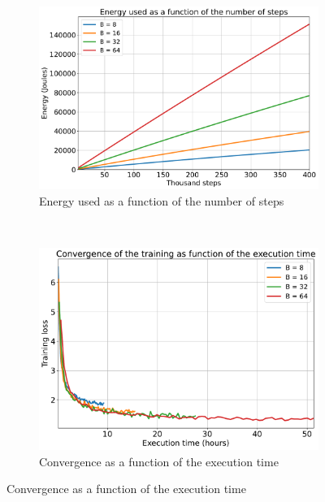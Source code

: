 \documentclass{article}
\begin{document}
{\begin{figure}[!h]
\begin{subfigure}[b]{0.47 \textwidth}
                \includegraphics[trim = {0.0in 0.01in 0.0in 0.0in}, clip, width = 1.005 \textwidth]{../Figures/energy_history_validation.pdf}
                \caption{Energy used as a function of the number of steps}
                \label{fig:convergence_energy_validation}
            \end{subfigure}
            ~
            \begin{subfigure}[b]{0.47 \textwidth}
                \vspace{1.0em}
                \includegraphics[trim = {0.0in 0.0in 0.0in 0.0in}, clip, width = 1.0 \textwidth]{../Figures/time_vs_accuracy_validation.pdf}
                \caption{Convergence as a function of the execution time}
                \label{fig:time_vs_accuracy_validation}
            \end{subfigure}

\end{figure}}
\end{document}
